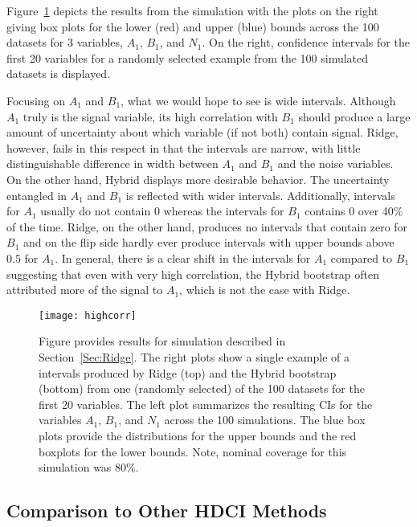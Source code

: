 Figure~\ref{Fig:highcorr} depicts the results from the simulation with the plots on the right giving box plots for the lower (red) and upper (blue) bounds across the 100 datasets for 3 variables, $A_1$, $B_1$, and $N_1$. On the right, confidence intervals for the first 20 variables for a randomly selected example from the 100 simulated datasets is displayed.

Focusing on $A_1$ and $B_1$, what we would hope to see is wide intervals. Although $A_1$ truly is the signal variable, its high correlation with $B_1$ should produce a large amount of uncertainty about which variable (if not both) contain signal. Ridge, however, fails in this respect in that the intervals are narrow, with little distinguishable difference in width between $A_1$ and $B_1$ and the noise variables. On the other hand, Hybrid displays more desirable behavior. The uncertainty entangled in $A_1$ and $B_1$ is reflected with wider intervals. Additionally, intervals for $A_1$ usually do not contain 0 whereas the intervals for $B_1$ contains 0 over 40\% of the time. Ridge, on the other hand, produces no intervals that contain zero for $B_1$ and on the flip side hardly ever produce intervals with upper bounds above $0.5$ for $A_1$. In general, there is a clear shift in the intervals for $A_1$ compared to $B_1$ suggesting that even with very high correlation, the Hybrid bootstrap often attributed more of the signal to $A_1$, which is not the case with Ridge.

\begin{figure}[hbtp]
  \begin{center}
  \texttt{[image: highcorr]}
  \caption{\label{Fig:highcorr} Figure provides results for simulation described in Section~\ref{Sec:Ridge}. The right plots show a single example of a intervals produced by Ridge (top) and the Hybrid bootstrap (bottom) from one (randomly selected) of the 100 datasets for the first 20 variables. The left plot summarizes the resulting CIs for the variables $A_1$, $B_1$, and $N_1$ across the 100 simulations. The blue box plots provide the distributions for the upper bounds and the red boxplots for the lower bounds. Note, nominal coverage for this simulation was 80\%.}
  \end{center}
\end{figure}

\subsection{Comparison to Other HDCI Methods}\label{Sec:Comparison}

